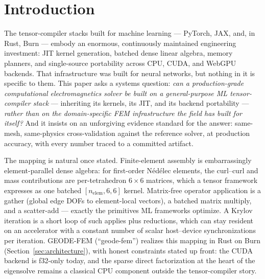 \documentclass{anvil-paper}
\begin{document}
\section{Introduction}
\label{sec:intro}

The tensor-compiler stacks built for machine learning --- PyTorch, JAX,
and, in Rust, Burn \citep{burn} --- embody an enormous, continuously
maintained engineering investment: JIT kernel generation, batched dense
linear algebra, memory planners, and single-source portability across CPU,
CUDA, and WebGPU backends. That infrastructure was built for neural
networks, but nothing in it is specific to them. This paper asks a
systems question: \emph{can a production-grade computational
electromagnetics solver be built on a general-purpose ML tensor-compiler
stack} --- inheriting its kernels, its JIT, and its backend portability
--- \emph{rather than on the domain-specific FEM infrastructure the field
has built for itself?} And it insists on an unforgiving evidence standard
for the answer: same-mesh, same-physics cross-validation against the
reference solver, at production accuracy, with every number traced to a
committed artifact.

The mapping is natural once stated. Finite-element assembly is
embarrassingly element-parallel dense algebra: for first-order N\'ed\'elec
elements, the curl--curl and mass contributions are per-tetrahedron
$6\times 6$ matrices, which a tensor framework expresses as one batched
$[n_{\mathrm{elem}},6,6]$ kernel. Matrix-free operator application is a
gather (global edge DOFs to element-local vectors), a batched matrix
multiply, and a scatter-add --- exactly the primitives ML frameworks
optimize. A Krylov iteration is a short loop of such applies plus
reductions, which can stay resident on an accelerator with a constant
number of scalar host--device synchronizations per iteration. GEODE-FEM
(``geode-fem'') realizes this mapping in Rust on Burn
(Section~\ref{sec:architecture}), with honest constraints stated up front:
the CUDA backend is f32-only today, and the sparse direct factorization at
the heart of the eigensolve remains a classical CPU component outside the
tensor-compiler story.
\end{document}
